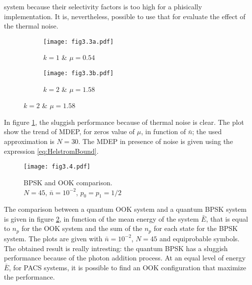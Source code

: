    system because their selectivity factors is too high for a phisically implementation. It is, 
    nevertheless, possible to use that for evaluate the effect of the thermal noise.
    \begin{figure}
        \caption{Thermal noise effect, in corrispondence of MDEP zeros ($N=40$).}
        \begin{subfigure}{0.49\textwidth}
            \texttt{[image: fig3.3a.pdf]}
            \caption{$k=1$ \& $\mu = 0.54$}
        \end{subfigure}
        \begin{subfigure}{0.49\textwidth}
            \texttt{[image: fig3.3b.pdf]}
            \caption{$k=2$ \& $\mu = 1.58$}
        \end{subfigure}
        \label{fig:3.3}
    \end{figure}
    In figure \ref{fig:3.3}, the sluggish performance because of thermal noise is clear. The plot
    show the trend of MDEP, for zeros value of $\mu$, in function of $\bar{n}$; the used approximation
    is $N=30$. The MDEP in presence of noise is given using the expression \ref{eq:HelstromBound}.

    \begin{figure}
        \caption{BPSK and OOK comparison. \\$N=45$, $\bar{n}=10^{-2}$, $p_0=p_1=1/2$}
        \texttt{[image: fig3.4.pdf]}
        \label{fig:3.4}
    \end{figure}
    The comparison between a quantum OOK system and a quantum BPSK system is given in figure 
    \ref{fig:3.4}, in function of the mean energy of the system $\bar{E}$, that is equal to
    $n_p$ for the OOK system and the sum of the $n_p$ for each state for the BPSK system.
    The plots are given with $\bar{n}= 10^{-2}$, $N=45$ and equiprobable symbols.
    The obtained result is really intresting: the quantum BPSK has a sluggish performance because
    of the photon addition process. At an equal level of energy $\bar{E}$, for PACS systems, it is
    possible to find an OOK configuration that maximize the performance.
    